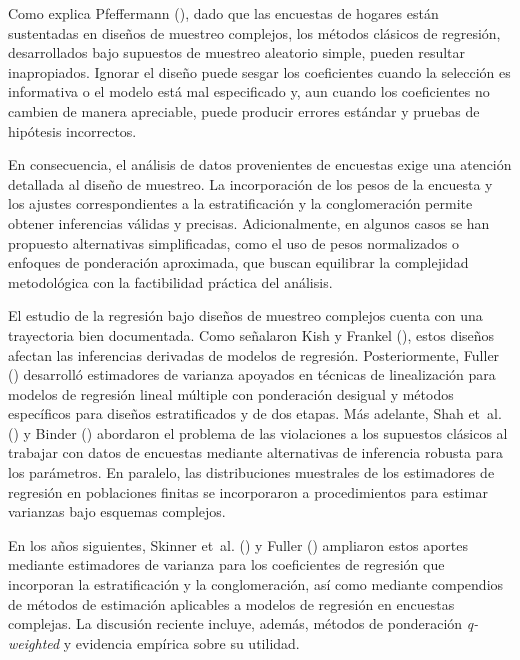 \documentclass[
  spanish,
  11pt,
  letterpaper,
  oneside,
  open=any]{scrbook}
\begin{document}
Como explica Pfeffermann
(), dado que las encuestas
de hogares están sustentadas en diseños de muestreo complejos, los
métodos clásicos de regresión, desarrollados bajo supuestos de muestreo
aleatorio simple, pueden resultar inapropiados. Ignorar el diseño puede
sesgar los coeficientes cuando la selección es informativa o el modelo
está mal especificado y, aun cuando los coeficientes no cambien de
manera apreciable, puede producir errores estándar y pruebas de
hipótesis incorrectos.

En consecuencia, el análisis de datos provenientes de encuestas exige
una atención detallada al diseño de muestreo. La incorporación de los
pesos de la encuesta y los ajustes correspondientes a la estratificación
y la conglomeración permite obtener inferencias válidas y precisas.
Adicionalmente, en algunos casos se han propuesto alternativas
simplificadas, como el uso de pesos normalizados o enfoques de
ponderación aproximada, que buscan equilibrar la complejidad
metodológica con la factibilidad práctica del análisis.

El estudio de la regresión bajo diseños de muestreo complejos cuenta con
una trayectoria bien documentada. Como señalaron Kish y Frankel
(), estos diseños afectan las
inferencias derivadas de modelos de regresión. Posteriormente, Fuller
() desarrolló estimadores de
varianza apoyados en técnicas de linealización para modelos de regresión
lineal múltiple con ponderación desigual y métodos específicos para
diseños estratificados y de dos etapas. Más adelante, Shah et~al.
() y Binder
() abordaron el problema de las
violaciones a los supuestos clásicos al trabajar con datos de encuestas
mediante alternativas de inferencia robusta para los parámetros. En
paralelo, las distribuciones muestrales de los estimadores de regresión
en poblaciones finitas se incorporaron a procedimientos para estimar
varianzas bajo esquemas complejos.

En los años siguientes, Skinner et~al.
() y Fuller
() ampliaron estos aportes
mediante estimadores de varianza para los coeficientes de regresión que
incorporan la estratificación y la conglomeración, así como mediante
compendios de métodos de estimación aplicables a modelos de regresión en
encuestas complejas. La discusión reciente incluye, además, métodos de
ponderación \emph{q-weighted} y evidencia empírica sobre su utilidad.
\end{document}
